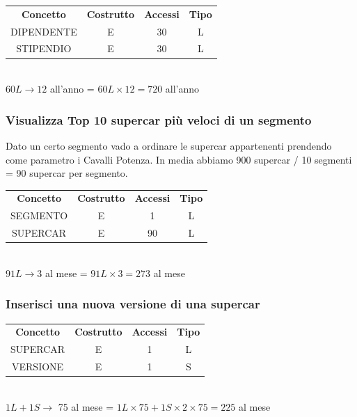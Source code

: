 \documentclass[12pt]{article}
\begin{document}
\begin{table}[H]
    \centering
    \begin{tabular}{ c c c c } 
        \rowcolor{red!20!}
        \textbf{Concetto} & \textbf{Costrutto} & \textbf{Accessi} &
        \textbf{Tipo}\\ 
        DIPENDENTE & E & 30 & L \\ 
        STIPENDIO & E & 30 & L \\ 
    \end{tabular}\\
    \( 60L \rightarrow 12 \) all'anno = \( 60L \times 12 = 720 \) all'anno
\end{table}

\subsubsection{Visualizza Top 10 supercar più veloci di un segmento}
\label{Visualizza Top 10 supercar più veloci di un segmento}

Dato un certo segmento vado a ordinare le supercar appartenenti prendendo come
parametro i Cavalli Potenza. In media abbiamo 900 supercar / 10 segmenti = 90
supercar per segmento.

\begin{table}[H]
    \centering
    \begin{tabular}{c c c c }
        \rowcolor{red!20!}
        \textbf{Concetto} & \textbf{Costrutto} & \textbf{Accessi} &
        \textbf{Tipo}\\
        SEGMENTO & E & 1 & L \\
        SUPERCAR & E & 90 & L \\
    \end{tabular}\\
    \( 91L  \rightarrow  3 \) al mese = \( 91L \times 3 = 273 \) al mese
\end{table}

\subsubsection{Inserisci una nuova versione di una supercar} \label{Inserisci
una nuova versione di una supercar}

\begin{table}[H]
    \centering
    \begin{tabular}{c c c c}
        \rowcolor{red!20!}
        \textbf{Concetto} & \textbf{Costrutto} & \textbf{Accessi} &
        \textbf{Tipo}\\
        SUPERCAR & E & 1 & L \\
        VERSIONE & E & 1 & S \\
    \end{tabular}\\
    \( 1L + 1S \rightarrow \) 75 al mese = \( 1L \times 75 + 1S \times 2 \times
    75 = 225 \) al mese
\end{table}
\end{document}
